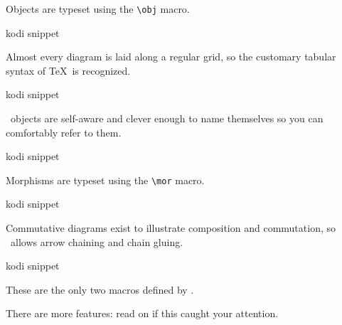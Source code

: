 Objects are typeset using the \lstinline|\obj| macro.

\begin{tcblisting}{kodi snippet}
\nilstrut{}
\end{tcblisting}

Almost every diagram is laid along a regular grid,
so the customary tabular syntax of \TeX\ is recognized.

\begin{tcblisting}{kodi snippet}
\nilstrut{}
\end{tcblisting}

\koDi\ objects are self-aware and clever enough to name themselves
so you can comfortably refer to them.

\begin{tcblisting}{kodi snippet}
\nilstrut{}
\end{tcblisting}

Morphisms are typeset using the \lstinline!\mor! macro.

\begin{tcblisting}{kodi snippet}
\nilstrut{}
\end{tcblisting}

Commutative diagrams exist to illustrate composition and commutation,
so \koDi\ allows arrow chaining and chain gluing.

\begin{tcblisting}{kodi snippet}
\nilstrut{}
\end{tcblisting}


These are the only two macros defined by \koDi.

There are more features: read on if this caught your attention.
